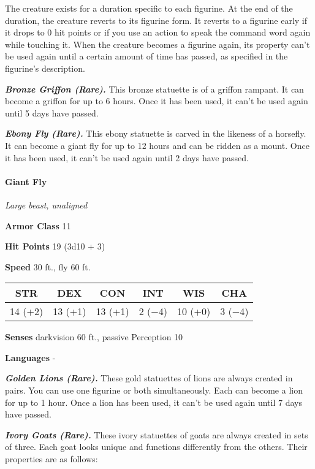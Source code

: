 \documentclass[
]{article}
\begin{document}
The creature exists for a duration specific to each figurine. At the end
of the duration, the creature reverts to its figurine form. It reverts
to a figurine early if it drops to 0 hit points or if you use an action
to speak the command word again while touching it. When the creature
becomes a figurine again, its property can't be used again until a
certain amount of time has passed, as specified in the figurine's
description.

\emph{\textbf{Bronze Griffon (Rare).}} This bronze statuette is of a
griffon rampant. It can become a griffon for up to 6 hours. Once it has
been used, it can't be used again until 5 days have passed.

\emph{\textbf{Ebony Fly (Rare).}} This ebony statuette is carved in the
likeness of a horsefly. It can become a giant fly for up to 12 hours and
can be ridden as a mount. Once it has been used, it can't be used again
until 2 days have passed.

\hypertarget{giant-fly}{%
\paragraph{Giant Fly}\label{giant-fly}}

\emph{Large beast, unaligned}

\textbf{Armor Class} 11

\textbf{Hit Points} 19 (3d10 + 3)

\textbf{Speed} 30 ft., fly 60 ft.

\begin{longtable}[]{@{}cccccc@{}}
\toprule
STR & DEX & CON & INT & WIS & CHA\tabularnewline
\midrule
\endhead
14 (+2) & 13 (+1) & 13 (+1) & 2 (−4) & 10 (+0) & 3 (−4)\tabularnewline
\bottomrule
\end{longtable}

\textbf{Senses} darkvision 60 ft., passive Perception 10

\textbf{Languages} -

\emph{\textbf{Golden Lions (Rare).}} These gold statuettes of lions are
always created in pairs. You can use one figurine or both
simultaneously. Each can become a lion for up to 1 hour. Once a lion has
been used, it can't be used again until 7 days have passed.

\emph{\textbf{Ivory Goats (Rare).}} These ivory statuettes of goats are
always created in sets of three. Each goat looks unique and functions
differently from the others. Their properties are as follows:
\end{document}
